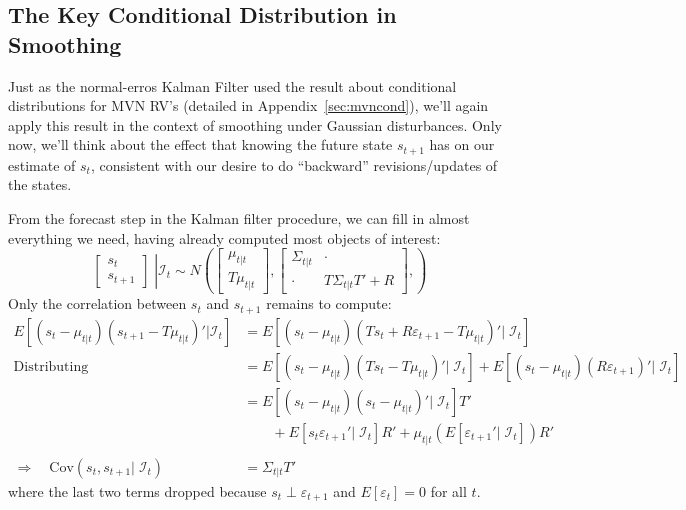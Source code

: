 \documentclass[a4paper,12pt]{article}
\begin{document}
\subsection{The Key Conditional Distribution in Smoothing}
\label{sec:smoothresult}

Just as the normal-erros Kalman Filter used the result about conditional
distributions for MVN RV's (detailed in Appendix~\ref{sec:mvncond}),
we'll again apply this result in the context of smoothing under Gaussian
disturbances. Only now, we'll think about the effect that knowing the
future state $s_{t+1}$ has on our estimate of $s_t$, consistent with our
desire to do ``backward'' revisions/updates of the states.

From the forecast step in the Kalman filter procedure, we can fill in
almost everything we need, having already computed most objects of
interest:
\begin{equation}
  \label{smoothsetup}
  \left. \begin{bmatrix} s_t \\ s_{t+1} \end{bmatrix} \;\right\rvert
  \mathcal{I}_t
  \sim N\left(
  \begin{bmatrix} \mu_{t|t} \\ T\mu_{t|t} \end{bmatrix},
  \begin{bmatrix} \Sigma_{t|t} & \cdot \\
                  \cdot & T\Sigma_{t|t} T'+R \end{bmatrix},
  \right)
\end{equation}
Only the correlation between $s_t$ and $s_{t+1}$ remains to compute:
\begin{align*}
  E\left[(s_t-\mu_{t|t})(s_{t+1}-T\mu_{t|t})' | \mathcal{I}_t\right] &=
    E\left[(s_t-\mu_{t|t})(Ts_t + R\varepsilon_{t+1}-T\mu_{t|t})' |\;
      \mathcal{I}_t\right] \\
  \text{Distributing} \qquad
    &= E\left[(s_t-\mu_{t|t})(Ts_t -T\mu_{t|t})' |\;
      \mathcal{I}_t\right]
    + E\left[(s_t-\mu_{t|t})(R\varepsilon_{t+1})' |\;
      \mathcal{I}_t\right] \\
  &= E\left[(s_t-\mu_{t|t})(s_t -\mu_{t|t})' |\;
      \mathcal{I}_t\right] T' \\
    &\qquad
    + E\left[s_t\varepsilon_{t+1}' |\;
      \mathcal{I}_t\right] R'
    + \mu_{t|t}\left(E\left[\varepsilon_{t+1}' |\;
      \mathcal{I}_t\right]\right)R' \\\\
  \Rightarrow\quad \text{Cov}(s_t, s_{t+1}|\; \mathcal{I}_t)
      &= \Sigma_{t|t}T'
\end{align*}
where the last two terms dropped because $s_t \perp \varepsilon_{t+1}$
and $E[\varepsilon_t]=0$ for all $t$.
\end{document}
